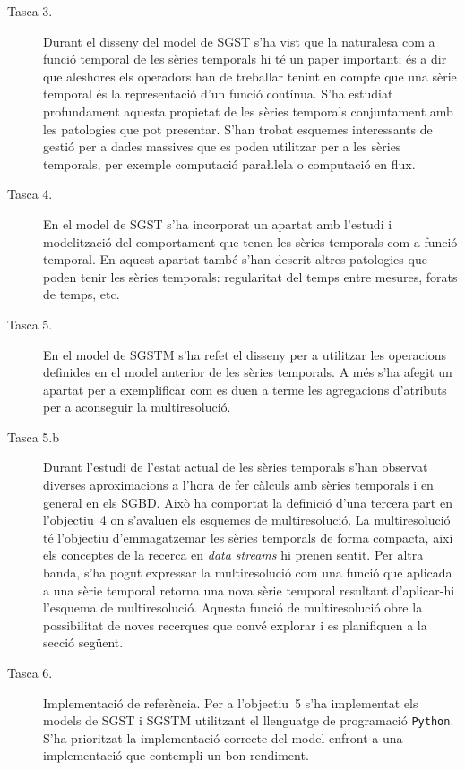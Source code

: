 \begin{description}



\item[Tasca 3.] Durant el disseny del model de SGST s'ha vist que la
  naturalesa com a funció temporal de les sèries temporals hi té un
  paper important; és a dir que aleshores els operadors han de
  treballar tenint en compte que una sèrie temporal és la
  representació d'un funció contínua. S'ha estudiat profundament
  aquesta propietat de les sèries temporals conjuntament amb les
  patologies que pot presentar. S'han trobat esquemes interessants de
  gestió per a dades massives que es poden utilitzar per a les sèries
  temporals, per exemple computació para\l.lela o computació en flux.


\item[Tasca 4.] En el model de SGST s'ha incorporat un apartat amb
  l'estudi i modelització del comportament que tenen les sèries
  temporals com a funció temporal. En aquest apartat també s'han
  descrit altres patologies que poden tenir les sèries temporals:
  regularitat del temps entre mesures, forats de temps, etc.


\item[Tasca 5.] En el model de SGSTM s'ha refet el disseny per a
  utilitzar les operacions definides en el model anterior de les
  sèries temporals. A més s'ha afegit un apartat per a exemplificar
  com es duen a terme les agregacions d'atributs per a aconseguir la
  multiresolució.



\item[Tasca 5.b] Durant l'estudi de l'estat actual de les sèries
  temporals s'han observat diverses aproximacions a l'hora de fer
  càlculs amb sèries temporals i en general en els SGBD. Això ha
  comportat la definició d'una tercera part en l'objectiu~4 on
  s'avaluen els esquemes de multiresolució.  La multiresolució té
  l'objectiu d'emmagatzemar les sèries temporals de forma compacta,
  així els conceptes de la recerca en \emph{data streams} hi prenen
  sentit.  Per altra banda, s'ha pogut expressar la multiresolució com
  una funció que aplicada a una sèrie temporal retorna una nova sèrie
  temporal resultant d'aplicar-hi l'esquema de multiresolució.
  Aquesta funció de multiresolució obre la possibilitat de noves
  recerques que convé explorar i es planifiquen a la secció següent.


\item[Tasca 6.] Implementació de referència. Per a l'objectiu~5 s'ha
  implementat els models de SGST i SGSTM utilitzant el llenguatge de
  programació \texttt{Python}. S'ha prioritzat la implementació
  correcte del model enfront a una implementació que contempli un bon
  rendiment. 


\end{description}
